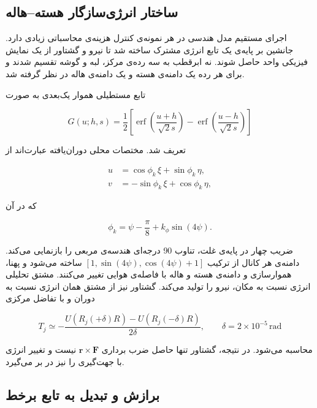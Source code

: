 \subsection{ساختار انرژی‌سازگار هسته--هاله}

اجرای مستقیم مدل هندسی در هر نمونه‌ی کنترل هزینه‌ی محاسباتی زیادی دارد. جانشین  بر پایه‌ی یک تابع انرژی مشترک ساخته شد تا نیرو و گشتاور از یک نمایش فیزیکی واحد حاصل شوند. نه ابرقطب به سه رده‌ی مرکز، لبه و گوشه تقسیم شدند و برای هر رده یک دامنه‌ی هسته و یک دامنه‌ی هاله در نظر گرفته شد.

تابع مستطیلی هموار یک‌بعدی به صورت

\begin{equation}
	G(u;h,s)=\frac{1}{2}\left[
	\operatorname{erf}\left(\frac{u+h}{\sqrt{2}s}\right)-
	\operatorname{erf}\left(\frac{u-h}{\sqrt{2}s}\right)
	\right]
	\label{eq:method-smooth-rectangle}
\end{equation}

تعریف شد. مختصات محلی دوران‌یافته عبارت‌اند از

\begin{align}
	u&=\cos\phi_k\,\xi+\sin\phi_k\,\eta,\\
	v&=-\sin\phi_k\,\xi+\cos\phi_k\,\eta,
\end{align}

که در آن

\begin{equation}
	\phi_k=\psi-\frac{\pi}{8}+k_\phi\sin(4\psi).
\end{equation}

ضریب چهار در پایه‌ی غلت، تناوب 90 درجه‌ای هندسه‌ی مربعی را بازنمایی می‌کند. دامنه‌ی هر کانال از ترکیب $[1,\sin(4\psi),\cos(4\psi)+1]$ ساخته می‌شود و پهنا، هموارسازی و دامنه‌ی هسته و هاله با فاصله‌ی هوایی تغییر می‌کنند. مشتق تحلیلی انرژی نسبت به مکان، نیرو را تولید می‌کند. گشتاور نیز از مشتق همان انرژی نسبت به دوران و با تفاضل مرکزی

\begin{equation}
	T_j\simeq-\frac{U(R_j(+\delta)R)-U(R_j(-\delta)R)}{2\delta},
	\qquad \delta=2\times10^{-5}\,\mathrm{rad}
	\label{eq:method-energy-torque}
\end{equation}

محاسبه می‌شود. در نتیجه، گشتاور تنها حاصل ضرب برداری $\mathbf r\times\mathbf F$ نیست و تغییر انرژی با جهت‌گیری را نیز در بر می‌گیرد.

\subsection{برازش و تبدیل به تابع برخط}

